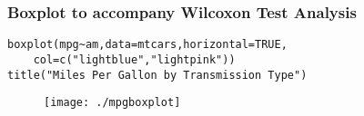 \documentclass[a4paper,12pt]{article}
\begin{document}
\subsubsection{Boxplot to accompany Wilcoxon Test Analysis}
\begin{framed}
\begin{verbatim}
boxplot(mpg~am,data=mtcars,horizontal=TRUE,
    col=c("lightblue","lightpink"))
title("Miles Per Gallon by Transmission Type")
\end{verbatim}
\end{framed}
\begin{figure}[h!]
\centering
\texttt{[image: ./mpgboxplot]}
\label{fig:mpgboxplot}
\end{figure}
\end{document}

